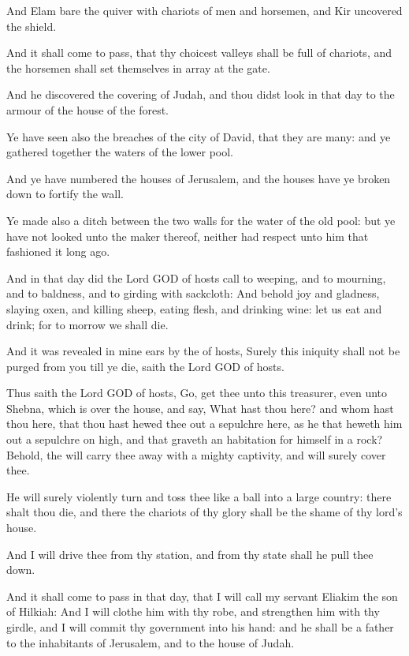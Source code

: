 \Verse And Elam bare the quiver with chariots of men and horsemen, and Kir uncovered the shield.

\Verse And it shall come to pass, that thy choicest valleys shall be full of chariots, and the horsemen shall set themselves in array at the gate.

\Verse And he discovered the covering of Judah, and thou didst look in that day to the armour of the house of the forest.

\Verse Ye have seen also the breaches of the city of David, that they are many: and ye gathered together the waters of the lower pool.

\Verse And ye have numbered the houses of Jerusalem, and the houses have ye broken down to fortify the wall.

\Verse Ye made also a ditch between the two walls for the water of the old pool: but ye have not looked unto the maker thereof, neither had respect unto him that fashioned it long ago.

\Verse And in that day did the Lord GOD of hosts call to weeping, and to mourning, and to baldness, and to girding with sackcloth: \Verse And behold joy and gladness, slaying oxen, and killing sheep, eating flesh, and drinking wine: let us eat and drink; for to morrow we shall die.

\Verse And it was revealed in mine ears by the \LORD of hosts, Surely this iniquity shall not be purged from you till ye die, saith the Lord GOD of hosts.

\Verse Thus saith the Lord GOD of hosts, Go, get thee unto this treasurer, even unto Shebna, which is over the house, and say, \Verse What hast thou here? and whom hast thou here, that thou hast hewed thee out a sepulchre here, as he that heweth him out a sepulchre on high, and that graveth an habitation for himself in a rock?  \Verse Behold, the \LORD will carry thee away with a mighty captivity, and will surely cover thee.

\Verse He will surely violently turn and toss thee like a ball into a large country: there shalt thou die, and there the chariots of thy glory shall be the shame of thy lord's house.

\Verse And I will drive thee from thy station, and from thy state shall he pull thee down.

\Verse And it shall come to pass in that day, that I will call my servant Eliakim the son of Hilkiah: \Verse And I will clothe him with thy robe, and strengthen him with thy girdle, and I will commit thy government into his hand: and he shall be a father to the inhabitants of Jerusalem, and to the house of Judah.

